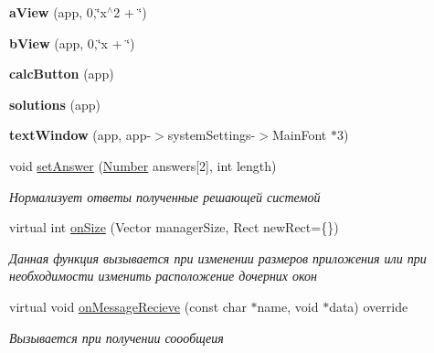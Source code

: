 \begin{DoxyCompactItemize}
\item 
\hypertarget{struct_solution_window_a18cf698a1c7e4078cb84e77e9a678313}{
{\bfseries aView} (app, 0,\char`\"{}x$^\wedge$2 + \char`\"{})}
\label{struct_solution_window_a18cf698a1c7e4078cb84e77e9a678313}

\item 
\hypertarget{struct_solution_window_a9d36a6bd6ba4a8407c91e31a662f25d4}{
{\bfseries bView} (app, 0,\char`\"{}x + \char`\"{})}
\label{struct_solution_window_a9d36a6bd6ba4a8407c91e31a662f25d4}

\item 
\hypertarget{struct_solution_window_ac1f68c80e77a760bde3a453df465ee89}{
{\bfseries calcButton} (app)}
\label{struct_solution_window_ac1f68c80e77a760bde3a453df465ee89}

\item 
\hypertarget{struct_solution_window_a3b5d4cafdf2e22baadcf98458031e361}{
{\bfseries solutions} (app)}
\label{struct_solution_window_a3b5d4cafdf2e22baadcf98458031e361}

\item 
\hypertarget{struct_solution_window_a49bd318a52dba8176399a31b12abdade}{
{\bfseries textWindow} (app, app-\/$>$systemSettings-\/$>$MainFont $\ast$3)}
\label{struct_solution_window_a49bd318a52dba8176399a31b12abdade}

\item 
void \hyperlink{group___u_i_gade5ec3301160d71543861fa5ff304b65}{setAnswer} (\hyperlink{struct_number}{Number} answers\mbox{[}2\mbox{]}, int length)
\begin{DoxyCompactList}\small\item\em Нормализует ответы полученные решающей системой \item\end{DoxyCompactList}\item 
virtual int \hyperlink{group___u_i_ga1c03a2ee74011c0a074af627afb8ed2f}{onSize} (Vector managerSize, Rect newRect=\{\})
\begin{DoxyCompactList}\small\item\em Данная функция вызывается при изменении размеров приложения или при необходимости изменить расположение дочерних окон \item\end{DoxyCompactList}\item 
virtual void \hyperlink{group___u_i_ga2d8d20928bef617e08770ec8d021fdcb}{onMessageRecieve} (const char $\ast$name, void $\ast$data) override
\begin{DoxyCompactList}\small\item\em Вызывается при получении соообщеия \item\end{DoxyCompactList}\end{DoxyCompactItemize}

